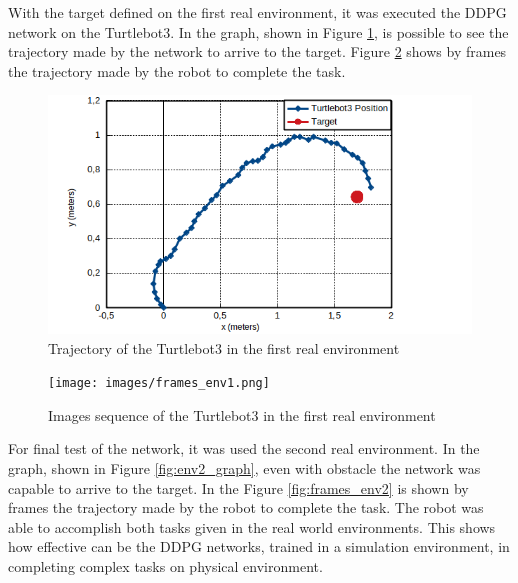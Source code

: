 
With the target defined on the first real environment, it was executed the DDPG network on the Turtlebot3.
In the graph, shown in {\color{blue}Figure} \ref{fig:env1_graph}, is possible to see the trajectory made by the network to arrive to the target.
{\color{blue}Figure} \ref{fig:frames_env1} shows by frames the trajectory made by the robot to complete the task.

\begin{figure}[H]
\centerline{\includegraphics[width=12cm]{images/env1_graph.png}}
\caption{Trajectory of the Turtlebot3 in the first real environment}
\label{fig:env1_graph}
\end{figure}

\begin{figure}[H]
\centerline{\texttt{[image: images/frames\_env1.png]}}
\caption{Images sequence of the Turtlebot3 in the first real environment}
\label{fig:frames_env1}
\end{figure}

For final test of the network, it was used the second real environment. In the graph, shown in {\color{blue}Figure} \ref{fig:env2_graph}, even with obstacle the network was capable to arrive to the target. In the {\color{blue}Figure} \ref{fig:frames_env2} is shown by frames the trajectory made by the robot to complete the task. %
The robot was able to accomplish both tasks given in the real world environments.
This shows how effective can be the DDPG networks, trained in a simulation environment, in completing complex tasks on physical environment.

